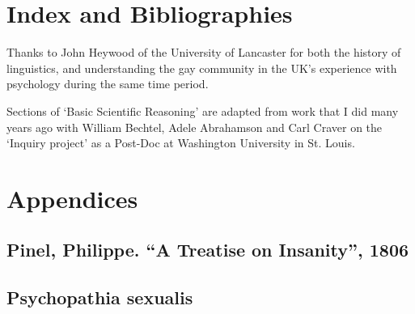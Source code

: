 \begin{refsection}
\begin{itemize}
\end{itemize}

\pagebreak 

\chapter{Index and Bibliographies}
\label{indexandbibliographies}


\printbibliography[heading=subbibliography]
\printindex




\pagebreak 

Thanks to John Heywood of the University of Lancaster for both the history of linguistics, and understanding the gay community in the UK’s experience with psychology during the same time period.

Sections of ‘Basic Scientific Reasoning’ are adapted from work that I did many years ago with William Bechtel, Adele Abrahamson and Carl Craver on the ‘Inquiry project’ as a Post-Doc at Washington University in St. Louis.

\pagebreak 

 \renewcommand*{\thechapter}{}
\renewcommand*{\thesection}{\Alph{section}}
\setcounter{chapter}{0}
\renewcommand*{\thesubsection}{\arabic{subsection}}



\chapter{Appendices}
\label{appendices}

\begin{appendices}
\let\svaddcontentsline\addcontentsline
\renewcommand\addcontentsline[3]{%
  \ifthenelse{\equal{#1}{lof}}{}%
  {\ifthenelse{\equal{#1}{lot}}{}{\svaddcontentsline{#1}{#2}{#3}}}}





\section{Pinel, Philippe. “A Treatise on Insanity”, 1806}
\label{pinelphilippe.“atreatiseoninsanity”1806}

\label{app: pinel}


\section{Psychopathia sexualis}
\label{psychopathiasexualis}


\end{appendices}
\end{refsection}
